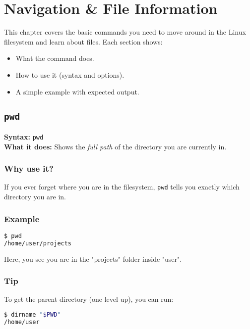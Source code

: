\documentclass[10pt,oneside]{scrbook}
\begin{document}
\chapter{Navigation \& File Information}

This chapter covers the basic commands you need to move around in the Linux filesystem and learn about files. Each section shows:
\begin{itemize}
  \item What the command does.
  \item How to use it (syntax and options).
  \item A simple example with expected output.
\end{itemize}

\section{\texttt{pwd}}
\begin{cmdbox}
  \textbf{Syntax:} \lstinline!pwd! \\
  \textbf{What it does:} Shows the \emph{full path} of the directory you are currently in.
\end{cmdbox}
\begin{commanddetails}
  \subsection*{Why use it?}
    If you ever forget where you are in the filesystem, \texttt{pwd} tells you exactly which directory you are in.

  \subsection*{Example}
  \begin{lstlisting}[language=bash]
$ pwd
/home/user/projects
  \end{lstlisting}
  Here, you see you are in the "projects" folder inside "user".

  \subsection*{Tip}
  To get the parent directory (one level up), you can run:
  \begin{lstlisting}[language=bash]
$ dirname "$PWD"
/home/user
  \end{lstlisting}
\end{commanddetails}
\end{document}
